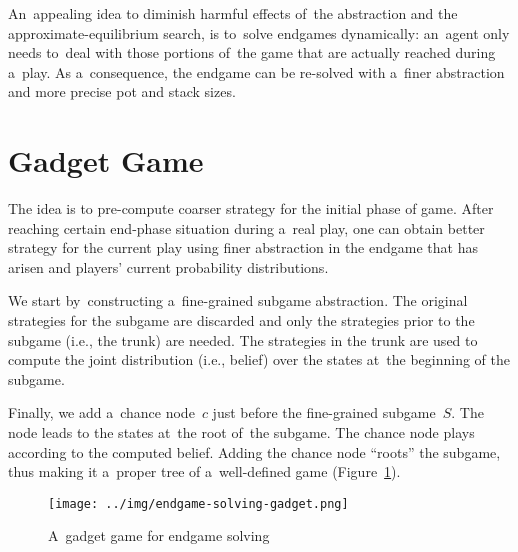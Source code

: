An~appealing idea to diminish harmful effects of~the abstraction and the approximate-equilibrium search, is to~solve endgames dynamically:
an~agent only needs to~deal with those portions of~the game that are actually reached during a~play.
As a~consequence, the endgame can be re-solved with a~finer abstraction and more precise pot and stack sizes.

\section{Gadget Game}
The idea is to pre-compute coarser strategy for the initial phase of game.
After reaching certain end-phase situation during a~real play, one can obtain better strategy for the current play using finer abstraction in the endgame that has arisen and players' current probability distributions.

We start by~constructing a~fine-grained subgame abstraction.
The original strategies for the subgame are discarded and only the strategies prior to the subgame (i.e., the trunk) are needed.
The strategies in the trunk are used to compute the joint distribution (i.e., belief) over the states at~the beginning of the subgame.

Finally, we add a~chance node~$c$ just before the fine-grained subgame~$S$.
The node leads to the states at~the root of~the subgame.
The chance node plays according to the computed belief.
Adding the chance node ``roots'' the subgame, thus making it a~proper tree of a~well-defined game (Figure~\ref{fig:endgame-solving-gadget}).
\begin{figure}[H]
  \centering
  \texttt{[image: ../img/endgame-solving-gadget.png]}
  \caption{A~gadget game for endgame solving}
  \label{fig:endgame-solving-gadget}
\end{figure}


